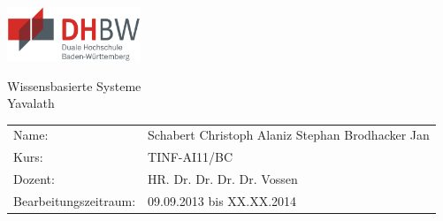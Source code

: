 \documentclass[german]{report}
\begin{document}
\pagestyle{fancy}

\rfoot{\thepage}
\fancyhfoffset{\marginparsep}
\renewcommand{\footrulewidth}{1.0pt}
\renewcommand{\headrulewidth}{1.0pt}
\renewcommand{\headheight}{30pt}


\begin{titlepage}

\begin{flushright}
    \includegraphics*[width=4.0cm]{abbildungen/dhbwlogo} \\ 
\end{flushright}
\begin{center}
\vspace{1.5cm}
\Huge{ \textsf{Wissensbasierte Systeme}} \\
	Yavalath\\
    \vspace{4cm}
 \normalsize{
    \begin{tabular}{ll}
    	Name: & {Schabert Christoph  Alaniz Stephan  Brodhacker Jan} \\
    	Kurs: & {TINF-AI11/BC}	\\
    	 Dozent: &  HR. Dr. Dr. Dr. Dr. Vossen\\
    	Bearbeitungszeitraum: & 09.09.2013 bis XX.XX.2014
    \end{tabular}\\
    }
\end{center}

\end{titlepage}

\newpage
\end{document}

